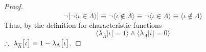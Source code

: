 \documentclass[preview]{standalone}
\begin{document}
\begin{proof}
\begin{equation*}
        \lnot \bigg[ \lnot \Big \langle \iota \in \overline{\Lambda} \Big \rangle \bigg]
            \equiv
        \lnot \Big \langle \iota \notin \overline{\Lambda} \Big \rangle
            \equiv
        \lnot \Big \langle \iota \in \Lambda \Big \rangle
            \equiv
        \Big \langle \iota \notin \Lambda \Big \rangle
    \end{equation*}
    Thus, by the definition for characteristic functions 
    \begin{equation*}
        \Big \langle 
            \lambda_{\overline{\Lambda}} \big[ \iota \big] = 1
        \Big \rangle
            \land
        \Big \langle 
            \lambda_{\Lambda} \big[ \iota \big] = 0
        \Big \rangle
    \end{equation*}
    $\therefore \text{\space} \relax{
        \lambda_{\overline{\Lambda}} \big[ \iota \big] 
            = 
        1 - \lambda_{\Lambda} \big[ \iota \big]
    }$.
\end{proof}
\end{document}
